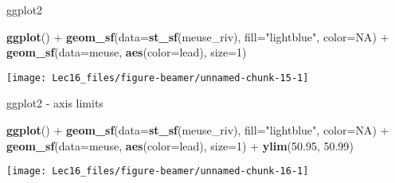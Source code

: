 \documentclass[11pt,ignorenonframetext,]{beamer}
\newenvironment{Shaded}{}{}
\newcommand{\DataTypeTok}[1]{\textcolor[rgb]{0.56,0.13,0.00}{#1}}
\newcommand{\DecValTok}[1]{\textcolor[rgb]{0.25,0.63,0.44}{#1}}
\newcommand{\FloatTok}[1]{\textcolor[rgb]{0.25,0.63,0.44}{#1}}
\newcommand{\KeywordTok}[1]{\textcolor[rgb]{0.00,0.44,0.13}{\textbf{#1}}}
\newcommand{\NormalTok}[1]{#1}
\newcommand{\OperatorTok}[1]{\textcolor[rgb]{0.40,0.40,0.40}{#1}}
\newcommand{\OtherTok}[1]{\textcolor[rgb]{0.00,0.44,0.13}{#1}}
\newcommand{\StringTok}[1]{\textcolor[rgb]{0.25,0.44,0.63}{#1}}
\let\oldShaded\Shaded
\let\endoldShaded\endShaded
\renewenvironment{Shaded}{\footnotesize\begin{spacing}{0.9}\oldShaded}{\endoldShaded\end{spacing}}
\let\oldverbatim\verbatim
\let\endoldverbatim\endverbatim
\newcommand{\scriptoutput}{
  \renewenvironment{Shaded}{\scriptsize\begin{spacing}{0.9}\oldShaded}{\endoldShaded\end{spacing}}
  \renewenvironment{verbatim}{\scriptsize\begin{spacing}{0.9}\oldverbatim}{\endoldverbatim\end{spacing}}
}
\begin{document}
\begin{frame}[fragile,t]{ggplot2}
\protect\hypertarget{ggplot2-1}{}

\scriptoutput

\begin{Shaded}
\begin{Highlighting}[]
\KeywordTok{ggplot}\NormalTok{() }\OperatorTok{+}
\StringTok{  }\KeywordTok{geom_sf}\NormalTok{(}\DataTypeTok{data=}\KeywordTok{st_sf}\NormalTok{(meuse_riv), }\DataTypeTok{fill=}\StringTok{"lightblue"}\NormalTok{, }\DataTypeTok{color=}\OtherTok{NA}\NormalTok{) }\OperatorTok{+}
\StringTok{  }\KeywordTok{geom_sf}\NormalTok{(}\DataTypeTok{data=}\NormalTok{meuse, }\KeywordTok{aes}\NormalTok{(}\DataTypeTok{color=}\NormalTok{lead), }\DataTypeTok{size=}\DecValTok{1}\NormalTok{)}
\end{Highlighting}
\end{Shaded}

\begin{center}\texttt{[image: Lec16\_files/figure-beamer/unnamed-chunk-15-1]} \end{center}

\end{frame}

\begin{frame}[fragile,t]{ggplot2 - axis limits}
\protect\hypertarget{ggplot2---axis-limits}{}

\scriptoutput

\begin{Shaded}
\begin{Highlighting}[]
\KeywordTok{ggplot}\NormalTok{() }\OperatorTok{+}
\StringTok{  }\KeywordTok{geom_sf}\NormalTok{(}\DataTypeTok{data=}\KeywordTok{st_sf}\NormalTok{(meuse_riv), }\DataTypeTok{fill=}\StringTok{"lightblue"}\NormalTok{, }\DataTypeTok{color=}\OtherTok{NA}\NormalTok{) }\OperatorTok{+}
\StringTok{  }\KeywordTok{geom_sf}\NormalTok{(}\DataTypeTok{data=}\NormalTok{meuse, }\KeywordTok{aes}\NormalTok{(}\DataTypeTok{color=}\NormalTok{lead), }\DataTypeTok{size=}\DecValTok{1}\NormalTok{) }\OperatorTok{+}
\StringTok{  }\KeywordTok{ylim}\NormalTok{(}\FloatTok{50.95}\NormalTok{, }\FloatTok{50.99}\NormalTok{)}
\end{Highlighting}
\end{Shaded}

\begin{center}\texttt{[image: Lec16\_files/figure-beamer/unnamed-chunk-16-1]} \end{center}

\end{frame}
\end{document}
